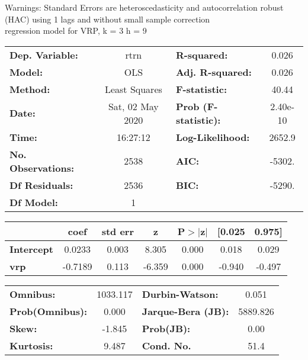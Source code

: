 Warnings: \newline
 [1] Standard Errors are heteroscedasticity and autocorrelation robust (HAC) using 1 lags and without small sample correction\\ 

regression model for VRP, k = 3 h = 9\begin{center}
\begin{tabular}{lclc}
\toprule
\textbf{Dep. Variable:}    &       rtrn       & \textbf{  R-squared:         } &     0.026   \\
\textbf{Model:}            &       OLS        & \textbf{  Adj. R-squared:    } &     0.026   \\
\textbf{Method:}           &  Least Squares   & \textbf{  F-statistic:       } &     40.44   \\
\textbf{Date:}             & Sat, 02 May 2020 & \textbf{  Prob (F-statistic):} &  2.40e-10   \\
\textbf{Time:}             &     16:27:12     & \textbf{  Log-Likelihood:    } &    2652.9   \\
\textbf{No. Observations:} &        2538      & \textbf{  AIC:               } &    -5302.   \\
\textbf{Df Residuals:}     &        2536      & \textbf{  BIC:               } &    -5290.   \\
\textbf{Df Model:}         &           1      & \textbf{                     } &             \\
\bottomrule
\end{tabular}
\begin{tabular}{lcccccc}
                   & \textbf{coef} & \textbf{std err} & \textbf{z} & \textbf{P$> |$z$|$} & \textbf{[0.025} & \textbf{0.975]}  \\
\midrule
\textbf{Intercept} &       0.0233  &        0.003     &     8.305  &         0.000        &        0.018    &        0.029     \\
\textbf{vrp}       &      -0.7189  &        0.113     &    -6.359  &         0.000        &       -0.940    &       -0.497     \\
\bottomrule
\end{tabular}
\begin{tabular}{lclc}
\textbf{Omnibus:}       & 1033.117 & \textbf{  Durbin-Watson:     } &    0.051  \\
\textbf{Prob(Omnibus):} &   0.000  & \textbf{  Jarque-Bera (JB):  } & 5889.826  \\
\textbf{Skew:}          &  -1.845  & \textbf{  Prob(JB):          } &     0.00  \\
\textbf{Kurtosis:}      &   9.487  & \textbf{  Cond. No.          } &     51.4  \\
\bottomrule
\end{tabular}
\end{center}

